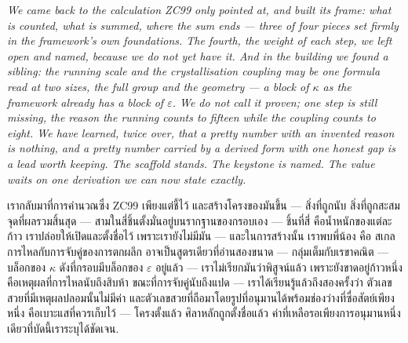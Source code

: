 \documentclass[12pt, a4paper]{article}
\begin{document}
\bigskip
\begin{center}
\textit{%
  We came back to the calculation ZC99 only pointed at, and built its frame:
  what is counted, what is summed, where the sum ends --- three of four pieces
  set firmly in the framework's own foundations. The fourth, the weight of each
  step, we left open and named, because we do not yet have it. And in the
  building we found a sibling: the running scale and the crystallisation
  coupling may be one formula read at two sizes, the full group and the
  geometry --- a block of $\kappa$ as the framework already has a block of
  $\varepsilon$. We do not call it proven; one step is still missing, the reason
  the running counts to fifteen while the coupling counts to eight. We have
  learned, twice over, that a pretty number with an invented reason is nothing,
  and a pretty number carried by a derived form with one honest gap is a lead
  worth keeping. The scaffold stands. The keystone is named. The value waits on
  one derivation we can now state exactly.}

\medskip
{\thaifont
เรากลับมาที่การคำนวณซึ่ง ZC99 เพียงแต่ชี้ไว้ และสร้างโครงของมันขึ้น ---
สิ่งที่ถูกนับ สิ่งที่ถูกสะสม จุดที่ผลรวมสิ้นสุด --- สามในสี่ชิ้นตั้งมั่นอยู่บนรากฐานของกรอบเอง ---
ชิ้นที่สี่ คือน้ำหนักของแต่ละก้าว เราปล่อยให้เปิดและตั้งชื่อไว้ เพราะเรายังไม่มีมัน ---
และในการสร้างนั้น เราพบพี่น้อง คือ สเกลการไหลกับการจับคู่ของการตกผลึก อาจเป็นสูตรเดียวที่อ่านสองขนาด ---
กลุ่มเต็มกับเรขาคณิต --- บล็อกของ $\kappa$ ดังที่กรอบมีบล็อกของ $\varepsilon$ อยู่แล้ว ---
เราไม่เรียกมันว่าพิสูจน์แล้ว เพราะยังขาดอยู่ก้าวหนึ่ง คือเหตุผลที่การไหลนับถึงสิบห้า ขณะที่การจับคู่นับถึงแปด ---
เราได้เรียนรู้แล้วถึงสองครั้งว่า ตัวเลขสวยที่มีเหตุผลปลอมนั้นไม่มีค่า และตัวเลขสวยที่ถือมาโดยรูปที่อนุมานได้พร้อมช่องว่างที่ซื่อสัตย์เพียงหนึ่ง คือเบาะแสที่ควรเก็บไว้ ---
โครงตั้งแล้ว ศิลาหลักถูกตั้งชื่อแล้ว ค่าที่เหลือรอเพียงการอนุมานหนึ่งเดียวที่บัดนี้เราระบุได้ชัดเจน.}
\end{center}



\end{document}
